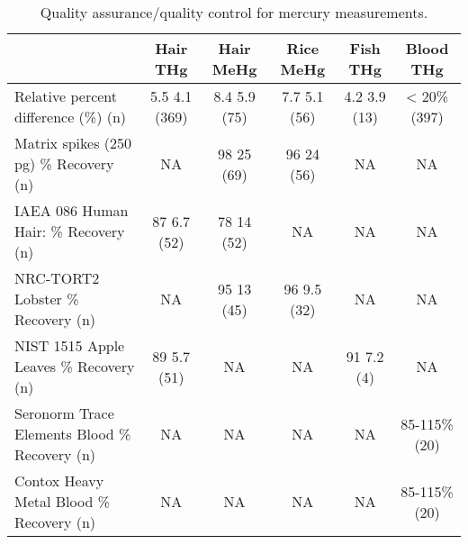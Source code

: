 \begin{table}[htp]
\tiny
\caption[Quality assurance/quality control for mercury measurements]{Quality assurance/quality control for mercury measurements. }
\begin{center}
\begin{tabular}{|p{3cm}|c|c|c|c|c|}
\hline
 & Hair THg & Hair MeHg & Rice MeHg & Fish THg & Blood THg  \\ \hline
Relative percent difference (\%) (n) & 5.5  4.1 (369) & 8.4  5.9 (75) & 7.7  5.1 (56) & 4.2  3.9 (13) & < 20\% (397)  \\ \hline
Matrix spikes (250 pg)
\% Recovery (n) & NA & 98  25 (69) & 96  24  (56) & NA & NA  \\ \hline
IAEA 086 Human Hair:
\% Recovery (n) & 87  6.7 (52) & 78  14 (52) & NA & NA & NA  \\ \hline
NRC-TORT2 Lobster
\% Recovery (n) & NA & 95  13 (45) & 96  9.5 (32) & NA & NA  \\ \hline
NIST 1515 Apple Leaves
\% Recovery (n) & 89  5.7 (51) & NA & NA & 91  7.2 (4) & NA  \\ \hline
Seronorm Trace Elements Blood \% Recovery (n) & NA & NA & NA & NA & 85-115\% (20)  \\ \hline
Contox Heavy Metal
Blood \% Recovery (n) & NA & NA & NA & NA & 85-115\% (20)  \\ \hline
\end{tabular}
\end{center}
\label{default}
\end{table}